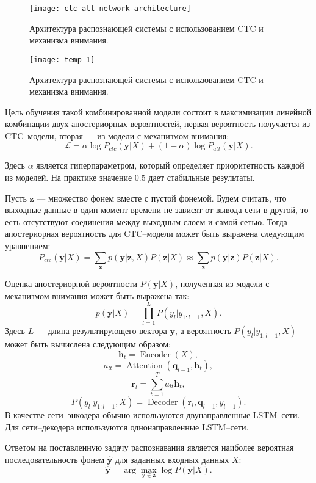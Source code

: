 \begin{figure}[h]
	\centering
	\texttt{[image: ctc-att-network-architecture]}
	\caption{Архитектура распознающей системы с использованием CTC и механизма внимания.}
	\label{fig:network-architecture}
\end{figure}

\begin{figure}[h]
	\centering
	\texttt{[image: temp-1]}
	\caption{Архитектура распознающей системы с использованием CTC и механизма внимания.}
	\label{fig:temp-1}
\end{figure}

Цель обучения такой комбинированной модели состоит в максимизации линейной комбинации двух апостериорных вероятностей, первая вероятность получается из CTC--модели, вторая --- из модели с механизмом внимания:
$$\mathcal{L} = \alpha \log P_{ctc}(\mathbf{y} | X) + (1 - \alpha)\log P_{att}(\mathbf{y} | X).$$

Здесь $\alpha$ является гиперпараметром, который определяет приоритетность каждой из моделей. На практике значение $0.5$ дает стабильные результаты.

Пусть $\mathbf{z}$ --- множество фонем вместе с пустой фонемой. Будем считать, что выходные данные в один момент времени не зависят от вывода сети в другой, то есть отсутствуют соединения между выходным слоем и самой сетью. Тогда апостериорная вероятность для CTC--модели может быть выражена следующим уравнением:
$$P_{ctc}(\mathbf{y}|X) = \sum_{\mathbf{z}} p(\mathbf{y} | \mathbf{z}, X) P(\mathbf{z} | X) \approx \sum_{\mathbf{z}} p(\mathbf{y} | \mathbf{z}) P(\mathbf{z} | X).$$

Оценка апостериорной вероятности $P(\mathbf{y}|X)$, полученная из модели с механизмом внимания может быть выражена так:
$$p(\mathbf{y}|X) = \prod_{l = 1}^{L}P(y_l | y_{1:l - 1}, X).$$
Здесь $L$ --- длина результирующего вектора $\mathbf{y}$, а вероятность $P(y_l | y_{1:l - 1}, X)$ может быть вычислена следующим образом:
$$\mathbf{h}_t = \operatorname{Encoder}(X),$$
$$a_{lt} = \operatorname{Attention}(\mathbf{q}_{l - 1}, \mathbf{h}_t),$$
$$\mathbf{r}_l = \sum_{t = 1}^{T} a_{lt}\mathbf{h}_t,$$
$$P(y_l | y_{1:l - 1}, X) = \operatorname{Decoder}(\mathbf{r}_l, \mathbf{q}_{l - 1}, y_{l-1}).$$
В качестве сети--энкодера обычно используются двунаправленные LSTM--сети\cite{graves2013hybrid}. Для сети--декодера используются однонаправленные LSTM--сети.

Ответом на поставленную задачу распознавания является наиболее вероятная последовательность фонем $\hat{\mathbf{y}}$ для заданных входных данных $X$:
$$\hat{\mathbf{y}} = \arg \max_{\mathbf{y} \in \mathbf{z}} \log P(\mathbf{y} | X).$$

